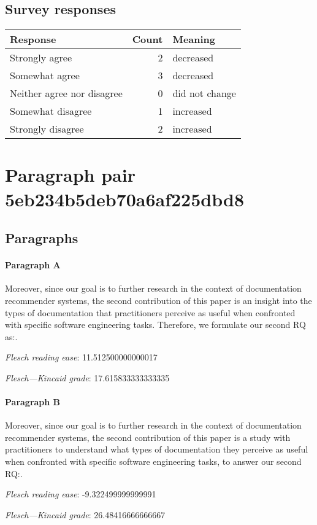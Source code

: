 \subsection{Survey responses}
\begin{tabular}{lrl}
\toprule
          \textbf{Response} &  \textbf{Count} & \textbf{Meaning} \\
\midrule
             Strongly agree &               2 &        decreased \\
             Somewhat agree &               3 &        decreased \\
 Neither agree nor disagree &               0 &   did not change \\
          Somewhat disagree &               1 &        increased \\
          Strongly disagree &               2 &        increased \\
\bottomrule
\end{tabular}

\section{Paragraph pair 5eb234b5deb70a6af225dbd8}
\subsection{Paragraphs}
\paragraph{Paragraph A}
Moreover, since our goal is to further research in the context of documentation recommender systems, the second contribution of this paper is an insight into the types of documentation that practitioners perceive as useful when confronted with specific software engineering tasks. Therefore, we formulate our second RQ as:.\par\medskip\emph{Flesch reading ease}: 11.512500000000017\par\emph{Flesch---Kincaid grade}: 17.615833333333335

\paragraph{Paragraph B}
Moreover, since our goal is to further research in the context of documentation recommender systems, the second contribution of this paper is a study with practitioners to understand what types of documentation they perceive as useful when confronted with specific software engineering tasks, to answer our second RQ:.\par\medskip\emph{Flesch reading ease}: -9.322499999999991\par\emph{Flesch---Kincaid grade}: 26.48416666666667


